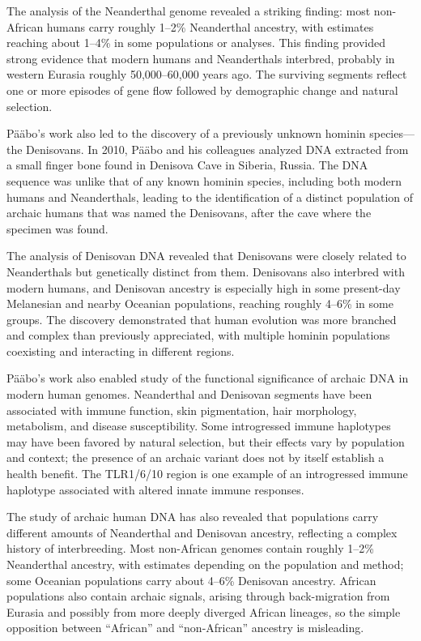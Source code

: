 The analysis of the Neanderthal genome revealed a striking finding: most non-African humans carry roughly 1--2\% Neanderthal ancestry, with estimates reaching about 1--4\% in some populations or analyses. This finding provided strong evidence that modern humans and Neanderthals interbred, probably in western Eurasia roughly 50,000--60,000 years ago. The surviving segments reflect one or more episodes of gene flow followed by demographic change and natural selection.

P\"a\"abo's work also led to the discovery of a previously unknown hominin species---the Denisovans. In 2010, P\"a\"abo and his colleagues analyzed DNA extracted from a small finger bone found in Denisova Cave in Siberia, Russia. The DNA sequence was unlike that of any known hominin species, including both modern humans and Neanderthals, leading to the identification of a distinct population of archaic humans that was named the Denisovans, after the cave where the specimen was found.

The analysis of Denisovan DNA revealed that Denisovans were closely related to Neanderthals but genetically distinct from them. Denisovans also interbred with modern humans, and Denisovan ancestry is especially high in some present-day Melanesian and nearby Oceanian populations, reaching roughly 4--6\% in some groups. The discovery demonstrated that human evolution was more branched and complex than previously appreciated, with multiple hominin populations coexisting and interacting in different regions.

P\"a\"abo's work also enabled study of the functional significance of archaic DNA in modern human genomes. Neanderthal and Denisovan segments have been associated with immune function, skin pigmentation, hair morphology, metabolism, and disease susceptibility. Some introgressed immune haplotypes may have been favored by natural selection, but their effects vary by population and context; the presence of an archaic variant does not by itself establish a health benefit. The TLR1/6/10 region is one example of an introgressed immune haplotype associated with altered innate immune responses.

The study of archaic human DNA has also revealed that populations carry different amounts of Neanderthal and Denisovan ancestry, reflecting a complex history of interbreeding. Most non-African genomes contain roughly 1--2\% Neanderthal ancestry, with estimates depending on the population and method; some Oceanian populations carry about 4--6\% Denisovan ancestry. African populations also contain archaic signals, arising through back-migration from Eurasia and possibly from more deeply diverged African lineages, so the simple opposition between ``African'' and ``non-African'' ancestry is misleading.

